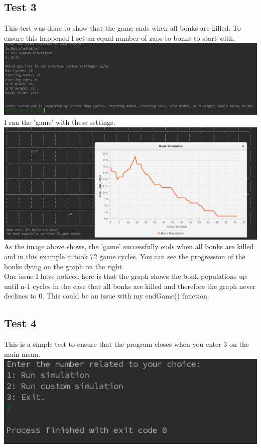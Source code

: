 \documentclass[12pt]{article}
\begin{document}
\subsection{Test 3}
This test was done to show that the game ends when all bonks are killed. To ensure this happened I set an equal number of zaps to bonks to start with.\\
\includegraphics[width=15cm]{test3a}
I ran the 'game' with these settings.\\
\includegraphics[width=15cm]{test3b}
As the image above shows, the 'game' successfully ends when all bonks are killed and in this example it took 72 game cycles. You can see the progression of the bonks dying on the graph on the right.\\ 
One issue I have noticed here is that the graph shows the bonk populations up until n-1 cycles in the case that all bonks are killed and therefore the graph never declines to 0. This could be an issue with my endGame() function.

\subsection{Test 4}
This is a simple test to ensure that the program closes when you enter 3 on the main menu.\\
\includegraphics[width=15cm]{test4}
\end{document}

